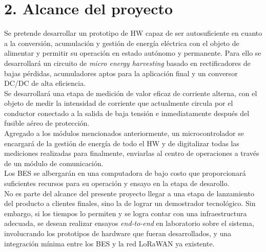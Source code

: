 \documentclass[11pt]{charter}
\begin{document}
\section{2. Alcance del proyecto}
\label{sec:alcance}
Se pretende desarrollar un prototipo de HW capaz de ser autosuficiente en cuanto a la conversión, acumulación y gestión de energía eléctrica con el objeto de alimentar y permitir su operación en estado autónomo y permanente. Para ello se desarrollará un circuito de \textit{micro energy harvesting} basado en rectificadores de bajas pérdidas, acumuladores aptos para la aplicación final y un conversor DC/DC de alta eficiencia.\\

Se desarrollará una etapa de medición de valor eficaz de corriente alterna, con el objeto de medir la intensidad de corriente que actualmente circula por el conductor conectado a la salida de baja tensión e inmediatamente después del fusible aéreo de protección.\\

Agregado a los módulos mencionados anteriormente, un microcontrolador se encargará de la gestión de energía de todo el HW y de digitalizar todas las mediciones realizadas para finalmente, enviarlas al centro de operaciones a través de un módulo de comunicación.\\

Los BES se albergarán en una computadora de bajo costo que proporcionará suficientes recursos para su operación y ensayo en la etapa de desarollo.\\

No es parte del alcance del presente proyecto llegar a una etapa de lanzamiento del producto a clientes finales, sino la de lograr un demostrador tecnológico. Sin embargo, si los tiempos lo permiten y se logra contar con una infraestructura adecuada, se desean realizar ensayos \textit{end-to-end} en laboratorio sobre el sistema, involucrando los prototipos de hardware que fueran desarrollados, y una integración mínima entre los BES y la red LoRaWAN ya existente.\\
\end{document}
